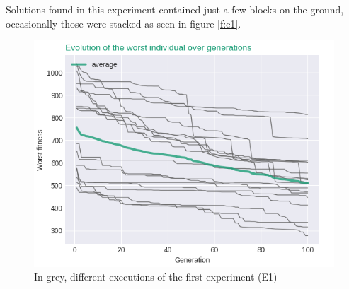 \documentclass[runningheads,a4paper]{llncs}
\begin{document}
Solutions found in this experiment contained just a few blocks on the ground,
occasionally those were stacked as seen in figure \ref{f:e1}.
\begin{figure}
	\centering
	\includegraphics[scale=0.5]{exp1_worstIndv.png}
	\caption{In grey, different executions of the first experiment (E1)}\label{f:grahp1}
\end{figure}
\begin{figure}[H]
	\centering
	\hfill
\end{figure}
\end{document}
